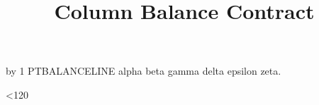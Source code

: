 \documentclass[nominted]{pt-article}
\title{Column Balance Contract}
\begin{document}
\makeatletter
{}
\makeatother

\newcount\ptbalanceline
{}
\loop
  \advance\ptbalanceline by 1
  PTBALANCELINE \the\ptbalanceline\quad
  alpha beta gamma delta epsilon zeta.\par
\ifnum\ptbalanceline<120
\repeat
\end{document}
